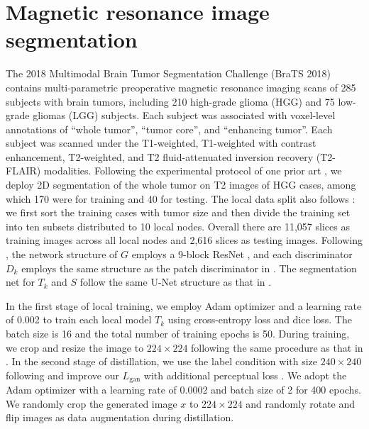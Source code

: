 \documentclass[letterpaper]{article} %
\begin{document}
\section{Magnetic resonance image segmentation}
The 2018 Multimodal Brain Tumor Segmentation Challenge (BraTS 2018)~\cite{menze2014multimodal, bakas2018identifying} contains multi-parametric preoperative magnetic resonance imaging scans of 285 subjects with brain tumors, including 210 high-grade glioma (HGG) and 75 low-grade gliomas (LGG) subjects.
Each subject was associated with voxel-level annotations of “whole tumor”, “tumor core”, and “enhancing tumor”. Each subject was scanned under the T1-weighted, T1-weighted with contrast enhancement, T2-weighted, and T2 fluid-attenuated inversion recovery (T2-FLAIR) modalities. Following the experimental protocol of one prior art \cite{chang2020synthetic}, we deploy 2D segmentation of the whole tumor on T2 images of HGG cases, among which 170 were for training and 40 for testing. The local data split also follows \cite{chang2020synthetic}: we first sort the training cases with tumor size and then divide the training set into ten subsets distributed to 10 local nodes. Overall there are 11,057 slices as training images across all local nodes and 2,616 slices as testing images. Following \cite{chang2020synthetic}, the network structure of $G$ employs a 9-block ResNet \cite{he2016deep}, and each discriminator $D_k$ employs the same structure as the patch discriminator in \cite{isola2017image}. The segmentation net for $T_k$ and $S$ follow the same U-Net \cite{ronneberger2015u} structure as that in \cite{chang2020synthetic}.

In the first stage of local training,
we employ Adam optimizer and a learning rate of 0.002 to train each local model $T_k$ using cross-entropy loss and dice loss. The batch size is 16 and the total number of training epochs is 50. During training, we crop and resize the image to $224 \times 224$ following the same procedure as that in \cite{chang2020synthetic}. In the second stage of distillation, we use the label condition with size $240 \times 240$ following \cite{chang2020synthetic} and improve our $L_\text{gan}$ with additional perceptual loss \cite{johnson2016perceptual}.
We adopt the Adam optimizer with a learning rate of 0.0002 and batch size of 2 for 400 epochs. We randomly crop the generated image $x$ to $224 \times 224$ and randomly rotate and flip images as data augmentation during distillation.
\end{document}

